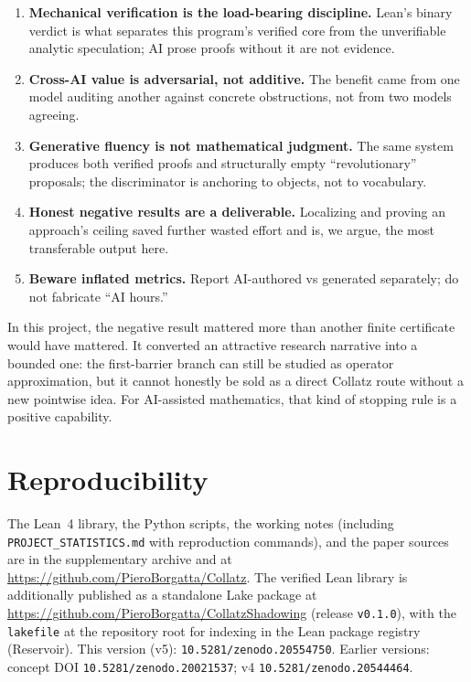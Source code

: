 \documentclass[11pt,a4paper]{article}
\theoremstyle{definition}
\begin{document}
\begin{enumerate}[leftmargin=2em]
  \item \textbf{Mechanical verification is the load-bearing discipline.}
        Lean's binary verdict is what separates this program's verified core
        from the unverifiable analytic speculation; AI prose proofs without it
        are not evidence.
  \item \textbf{Cross-AI value is adversarial, not additive.} The benefit came
        from one model auditing another against concrete obstructions, not
        from two models agreeing.
  \item \textbf{Generative fluency is not mathematical judgment.} The same
        system produces both verified proofs and structurally empty
        ``revolutionary'' proposals; the discriminator is anchoring to objects,
        not to vocabulary.
  \item \textbf{Honest negative results are a deliverable.} Localizing and
        proving an approach's ceiling saved further wasted effort and is, we
        argue, the most transferable output here.
  \item \textbf{Beware inflated metrics.} Report AI-authored vs generated
        separately; do not fabricate ``AI hours.''
\end{enumerate}

In this project, the negative result mattered more than another finite
certificate would have mattered. It converted an attractive research
narrative into a bounded one: the first-barrier branch can still be studied
as operator approximation, but it cannot honestly be sold as a direct
Collatz route without a new pointwise idea. For AI-assisted mathematics,
that kind of stopping rule is a positive capability.

\section{Reproducibility}
\label{sec:repro}

The Lean~4 library, the Python scripts, the working notes (including
\texttt{PROJECT\_STATISTICS.md} with reproduction commands), and the paper
sources are in the supplementary archive and at
\url{https://github.com/PieroBorgatta/Collatz}. The verified Lean library is
additionally published as a standalone Lake package at
\url{https://github.com/PieroBorgatta/CollatzShadowing} (release
\texttt{v0.1.0}), with the \texttt{lakefile} at the repository root for
indexing in the Lean package registry (Reservoir). This version (v5):
\texttt{10.5281/zenodo.20554750}. Earlier versions: concept DOI
\texttt{10.5281/zenodo.20021537}; v4 \texttt{10.5281/zenodo.20544464}.
\end{document}
